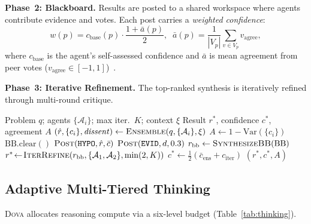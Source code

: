 \documentclass{article}
\theoremstyle{plain}
\theoremstyle{definition}
\newcommand{\dova}{\textsc{Dova}}
\begin{document}
\textbf{Phase~2: Blackboard.}\quad
Results are posted to a shared workspace where agents contribute evidence and
votes.  Each post carries a \emph{weighted confidence}:
\begin{equation}\label{eq:blackboard}
  w(p) = c_\mathrm{base}(p) \cdot \frac{1 + \bar{a}(p)}{2},
  \;\;
  \bar{a}(p) = \frac{1}{|V_p|}\!\sum_{v \in V_p}\! v_\mathrm{agree},
\end{equation}
where $c_\mathrm{base}$ is the agent's self-assessed confidence and $\bar{a}$
is mean agreement from peer votes
($v_\mathrm{agree} \in [-1, 1]$)~\citep{hayesroth1985blackboard}.

\textbf{Phase~3: Iterative Refinement.}\quad
The top-ranked synthesis is iteratively refined through multi-round critique.

\begin{algorithm}[ht!]
\caption{Hybrid Collaborative Reasoning}
\label{alg:hybrid}
\begin{algorithmic}
\REQUIRE Problem $q$; agents $\{\mathcal{A}_i\}$; max iter.\ $K$; context $\xi$
\ENSURE Result $r^*$, confidence $c^*$, agreement $A$
\STATE {}
\STATE $(\hat{r}, \{c_i\}, \mathit{dissent}) \leftarrow \textsc{Ensemble}(q, \{\mathcal{A}_i\}, \xi)$
\STATE $A \leftarrow 1 - \mathrm{Var}(\{c_i\})$
\STATE {}
\STATE $\mathrm{BB.clear}()$
\STATE $\textsc{Post}(\texttt{HYPO}, \hat{r}, \bar{c})$
  \STATE $\textsc{Post}(\texttt{EVID}, d, 0.3)$
\ENDFOR
\STATE $r_\mathrm{bb} \leftarrow \textsc{SynthesizeBB}(\mathrm{BB})$
\STATE {}
\STATE $r^* \!\leftarrow\! \textsc{IterRefine}(r_\mathrm{bb}, \{\mathcal{A}_1, \mathcal{A}_2\}, \min(2, K))$
\STATE $c^* \leftarrow \tfrac{1}{2}(\bar{c}_\mathrm{ens} + c_\mathrm{iter})$
\RETURN $(r^*, c^*, A)$
\end{algorithmic}
\end{algorithm}

\subsection{Adaptive Multi-Tiered Thinking}\label{sec:thinking}

\dova{} allocates reasoning compute via a six-level budget
(Table~\ref{tab:thinking}).
\end{document}
